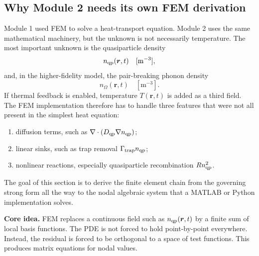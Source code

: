 \documentclass[11pt]{article}
\newcommand{\br}{{\bm{r}}}
\newcommand{\trap}{\mathrm{trap}}
\begin{document}
\subsection{Why Module 2 needs its own FEM derivation}
Module 1 used FEM to solve a heat-transport equation. Module 2 uses the same mathematical machinery, but the unknown is not necessarily temperature. The most important unknown is the quasiparticle density
\begin{equation}
 n_{\qp}(\br,t) \quad [\mathrm{m^{-3}}],
\end{equation}
and, in the higher-fidelity model, the pair-breaking phonon density
\begin{equation}
 n_{\Omega}(\br,t) \quad [\mathrm{m^{-3}}].
\end{equation}
If thermal feedback is enabled, temperature $T(\br,t)$ is added as a third field. The FEM implementation therefore has to handle three features that were not all present in the simplest heat equation:
\begin{enumerate}[leftmargin=1.6em]
    \item diffusion terms, such as $\nabla\cdot(D_{\mathrm{qp}}\nabla n_{\mathrm{qp}})$;
    \item linear sinks, such as trap removal $\Gamma_{\trap}n_{\qp}$;
    \item nonlinear reactions, especially quasiparticle recombination $R n_{\mathrm{qp}}^2$.
\end{enumerate}
The goal of this section is to derive the finite element chain from the governing strong form all the way to the nodal algebraic system that a MATLAB or Python implementation solves.

\begin{physicsbox}
\textbf{Core idea.} FEM replaces a continuous field such as $n_{\qp}(\br,t)$ by a finite sum of local basis functions. The PDE is not forced to hold point-by-point everywhere. Instead, the residual is forced to be orthogonal to a space of test functions. This produces matrix equations for nodal values.
\end{physicsbox}
\end{document}
